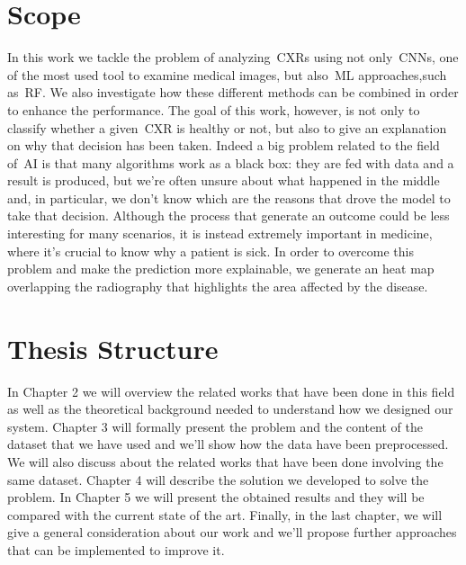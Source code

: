 \section{Scope}
\label{sec:scope}
In this work we tackle the problem of analyzing~\acp{CXR} using not only~\acp{CNN}, one of the most used tool to examine medical images, but also~\ac{ML} approaches,such as~\ac{RF}. We also investigate how these different methods can be combined in order to enhance the performance. The goal of this work, however, is not only to classify whether a given~\ac{CXR} is healthy or not, but also to give an explanation on why that decision has been taken. Indeed a big problem related to the field of~\ac{AI} is that many algorithms work as a black box: they are fed with data and a result is produced, but we're often unsure about what happened in the middle and, in particular, we don't know which are the reasons that drove the model to take that decision. Although the process that generate an outcome could be less interesting for many scenarios, it is instead extremely important in medicine, where it's crucial to know why a patient is sick. In order to overcome this problem and make the prediction more explainable, we generate an heat map overlapping the radiography that highlights the area affected by the disease.

\section{Thesis Structure}
\label{sec:third_section}
In Chapter 2 we will overview the related works that have been done in this field as well as the theoretical background needed to understand how we designed our system. Chapter 3 will formally present the problem and the content of the dataset that we have used and we'll show how the data have been preprocessed. We will also discuss about the related works that have been done involving the same dataset. Chapter 4 will describe the solution we developed to solve the problem. In Chapter 5 we will present the obtained results and they will be compared with the current state of the art. Finally, in the last chapter, we will give a general consideration about our work and we'll propose further approaches that can be implemented to improve it.
